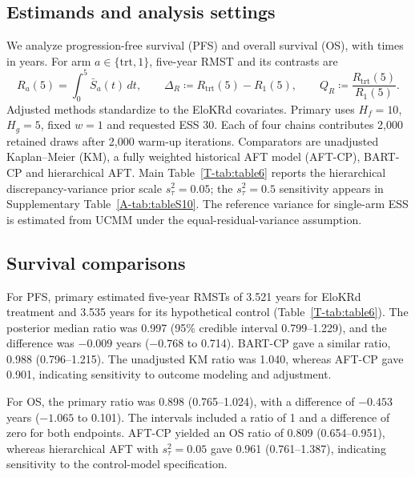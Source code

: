 \documentclass[11pt]{article}
\begin{document}
\subsection{Estimands and analysis settings}
We analyze progression-free survival (PFS) and overall survival (OS), with times in years. For arm $a\in\{\mathrm{trt},1\}$, five-year RMST and its contrasts are
\begin{equation}\label{eq:rmst}
R_a(5)=\int_0^5\bar S_a(t)\,dt,\qquad
\Delta_R\coloneqq R_{\mathrm{trt}}(5)-R_1(5),\qquad Q_R\coloneqq \frac{R_{\mathrm{trt}}(5)}{R_1(5)}.
\end{equation}
Adjusted methods standardize to the EloKRd covariates. Primary \lrc{} uses $H_f=10$, $H_g=5$, fixed $w=1$ and requested ESS 30. Each of four chains contributes 2,000 retained draws after 2,000 warm-up iterations. Comparators are unadjusted Kaplan--Meier (KM), a fully weighted historical AFT model (AFT-CP), BART-CP and hierarchical AFT. Main Table~\ref{T-tab:table6} reports the hierarchical discrepancy-variance prior scale $s_\tau^2=0.05$; the $s_\tau^2=0.5$ sensitivity appears in Supplementary Table~\ref{A-tab:tableS10}. The reference variance for single-arm ESS is estimated from UCMM under the equal-residual-variance assumption.

\subsection{Survival comparisons}
For PFS, primary \lrc{} estimated five-year RMSTs of 3.521 years for EloKRd treatment and 3.535 years for its hypothetical control (Table~\ref{T-tab:table6}). The posterior median ratio was 0.997 (95\% credible interval 0.799--1.229), and the difference was $-0.009$ years ($-0.768$ to 0.714). BART-CP gave a similar ratio, 0.988 (0.796--1.215). The unadjusted KM ratio was 1.040, whereas AFT-CP gave 0.901, indicating sensitivity to outcome modeling and adjustment.

For OS, the primary \lrc{} ratio was 0.898 (0.765--1.024), with a difference of $-0.453$ years ($-1.065$ to 0.101). The \lrc{} intervals included a ratio of 1 and a difference of zero for both endpoints. AFT-CP yielded an OS ratio of 0.809 (0.654--0.951), whereas hierarchical AFT with $s_\tau^2=0.05$ gave 0.961 (0.761--1.387), indicating sensitivity to the control-model specification.
\end{document}
